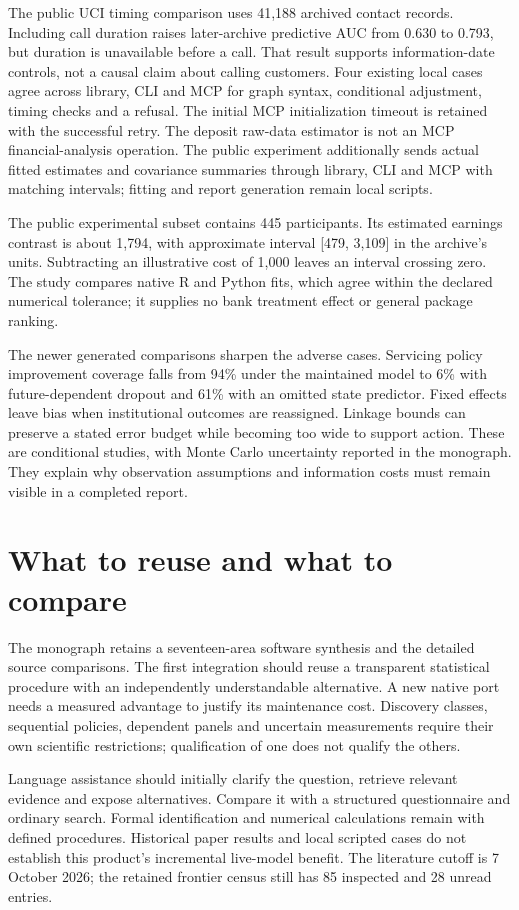 The public UCI timing comparison uses 41,188 archived contact records.
Including call duration raises later-archive predictive AUC from 0.630 to
0.793, but duration is unavailable before a call. That result supports
information-date controls, not a causal claim about calling customers.
Four existing local cases agree across library, CLI and MCP for graph
syntax, conditional adjustment, timing checks and a refusal. The initial
MCP initialization timeout is retained with the successful retry. The
deposit raw-data estimator is not an MCP financial-analysis operation. The
public experiment additionally sends actual fitted estimates and covariance
summaries through library, CLI and MCP with matching intervals; fitting and
report generation remain local scripts.

The public experimental subset contains 445 participants. Its estimated
earnings contrast is about 1,794, with approximate interval [479, 3,109] in
the archive's units. Subtracting an illustrative cost of 1,000 leaves an
interval crossing zero. The study compares native R and Python fits, which
agree within the declared numerical tolerance; it supplies no bank treatment
effect or general package ranking.

The newer generated comparisons sharpen the adverse cases. Servicing policy
improvement coverage falls from 94\% under the maintained model to 6\% with
future-dependent dropout and 61\% with an omitted state predictor. Fixed
effects leave bias when institutional outcomes are reassigned. Linkage bounds
can preserve a stated error budget while becoming too wide to support action.
These are conditional studies, with Monte Carlo uncertainty reported in the
monograph. They explain why observation assumptions and information costs
must remain visible in a completed report.

\section*{What to reuse and what to compare}
The monograph retains a seventeen-area software synthesis and the detailed
source comparisons. The first integration should reuse a transparent
statistical procedure with an independently understandable alternative.
A new native port needs a measured advantage to justify its maintenance
cost. Discovery classes, sequential policies, dependent panels and uncertain
measurements require their own scientific restrictions; qualification of
one does not qualify the others.

Language assistance should initially clarify the question, retrieve relevant
evidence and expose alternatives. Compare it with a structured questionnaire
and ordinary search. Formal identification and numerical calculations remain
with defined procedures. Historical paper results and local scripted cases
do not establish this product's incremental live-model benefit. The
literature cutoff is 7 October 2026; the retained frontier census still has
85 inspected and 28 unread entries.

